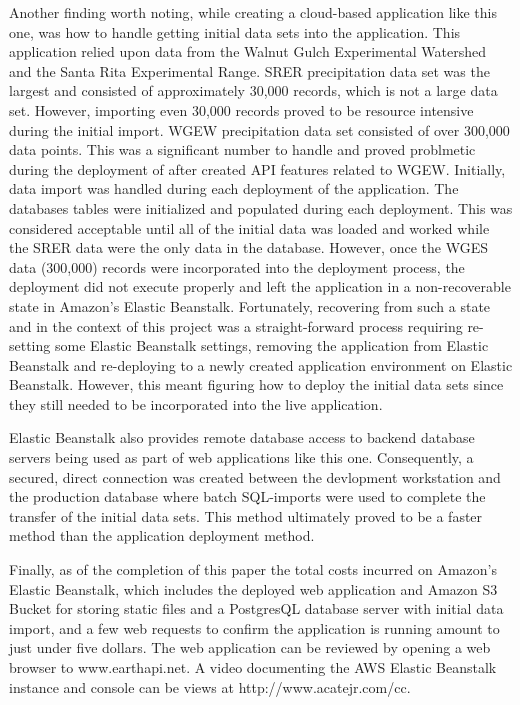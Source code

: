 Another finding worth noting, while creating a cloud-based application 
like this one, was how to handle getting initial data sets into the 
application.  This application relied upon data from the Walnut Gulch 
Experimental Watershed and the Santa Rita Experimental Range. SRER 
precipitation data set was the largest and consisted of approximately 30,000 
records, which is not a large data set.  However, importing even 30,000 
records proved to be resource intensive during the initial import.  WGEW 
precipitation data set consisted of over 300,000 data points.  This was a 
significant number to handle and proved problmetic during the deployment of 
after created API features related to WGEW.  Initially, data import was 
handled during each deployment of the application.  The databases tables were 
initialized and populated during each deployment.  This was considered 
acceptable until all of the initial data was loaded and worked while the SRER 
data were the only data in the database.  However, once the WGES data 
(300,000) records were incorporated into the deployment process, the 
deployment did not execute properly and left the application in a 
non-recoverable state in Amazon's Elastic Beanstalk.  Fortunately, recovering 
from such a state and in the context of this project was a straight-forward 
process requiring re-setting some Elastic Beanstalk settings, removing the 
application from Elastic Beanstalk and re-deploying to a newly created 
application environment on Elastic Beanstalk.  However, this meant figuring 
how to deploy the initial data sets since they still needed to be 
incorporated into the live application.  

Elastic Beanstalk also provides remote database access to backend database 
servers being used as part of web applications like this one.  Consequently, 
a secured, direct connection was created between the devlopment workstation 
and the production database where batch SQL-imports were used to complete the 
transfer of the initial data sets.  This method ultimately proved to be a 
faster method than the application deployment method.

Finally, as of the completion of this paper the total costs incurred on 
Amazon's Elastic Beanstalk, which includes the deployed web application 
and Amazon S3 Bucket for storing static files and a PostgresQL database 
server with initial data import, and a few web requests to confirm the 
application is running amount to just under five dollars.  The web 
application can be reviewed by opening a web browser to www.earthapi.net.  
A video documenting the AWS Elastic Beanstalk instance and console can be 
views at http://www.acatejr.com/cc.

